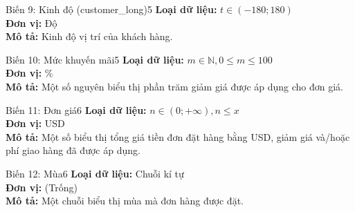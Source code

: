 \noindent
\begin{minipage}[t]{0.48\textwidth}
\begin{mainbox}{Biến 9: Kinh độ (customer\_long)}{5}
    \textbf{Loại dữ liệu:} \(t \in (-180; 180)\) \\
    \textbf{Đơn vị:} Độ \\
    \textbf{Mô tả:} Kinh độ vị trí của khách hàng.
\end{mainbox}
\end{minipage}
\hfill
\begin{minipage}[t]{0.48\textwidth}
\begin{mainbox}{Biến 10: Mức khuyến mãi}{5}
    \textbf{Loại dữ liệu:} \(m \in \mathbb{N}, 0 \leq m \leq 100\) \\
    \textbf{Đơn vị:} \% \\
    \textbf{Mô tả:} Một số nguyên biểu thị phần trăm giảm giá được áp dụng cho đơn giá.
\end{mainbox}
\end{minipage}

\vspace{0.5cm}

\noindent
\begin{minipage}[t]{0.48\textwidth}
\begin{mainbox}{Biến 11: Đơn giá}{6}
    \textbf{Loại dữ liệu:} \(n \in (0; +\infty), n \leq x\) \\
    \textbf{Đơn vị:} USD \\
    \textbf{Mô tả:} Một số biểu thị tổng giá tiền đơn đặt hàng bằng USD, giảm giá và/hoặc phí giao hàng đã được áp dụng.
\end{mainbox}
\end{minipage}
\hfill
\begin{minipage}[t]{0.48\textwidth}
\begin{mainbox}{Biến 12: Mùa}{6}
    \textbf{Loại dữ liệu:} Chuỗi kí tự \\
    \textbf{Đơn vị:} (Trống) \\
    \textbf{Mô tả:} Một chuỗi biểu thị mùa mà đơn hàng được đặt.
\end{mainbox}
\end{minipage}

\vspace{0.5cm}

